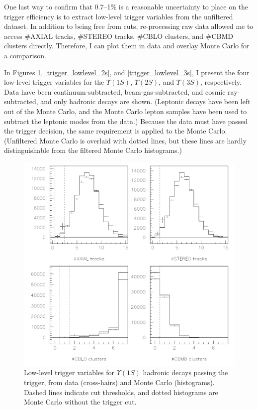 One last way to confirm that 0.7--1\% is a reasonable uncertainty to
place on the trigger efficiency is to extract low-level trigger
variables from the unfiltered dataset.  In addition to being free from
cuts, re-processing raw data allowed me to access \#AXIAL tracks,
\#STEREO tracks, \#CBLO clusters, and \#CBMD clusters directly.
Therefore, I can plot them in data and overlay Monte Carlo for a
comparison.

In Figures \ref{trigger_lowlevel_1s}, \ref{trigger_lowlevel_2s}, and
\ref{trigger_lowlevel_3s}, I present the four low-level trigger
variables for the $\Upsilon(1S)$, $\Upsilon(2S)$, and $\Upsilon(3S)$,
respectively.  Data have been continuum-subtracted,
beam-gas-subtracted, and cosmic ray-subtracted, and only hadronic
decays are shown.  (Leptonic decays have been left out of the Monte
Carlo, and the Monte Carlo lepton samples have been used to subtract
the leptonic modes from the data.)  Because the data must have passed
the trigger decision, the same requirement is applied to the Monte
Carlo.  (Unfiltered Monte Carlo is overlaid with dotted lines, but
these lines are hardly distinguishable from the filtered Monte Carlo
histograms.)

\begin{figure}[p]
  \begin{center}
    \includegraphics[width=\linewidth]{plots/trigger_lowlevel_1s}
  \end{center}
  \caption{\label{trigger_lowlevel_1s} Low-level trigger variables for
    $\Upsilon(1S)$ hadronic decays passing the trigger, from data
    (cross-hairs) and Monte Carlo (histograms).  Dashed lines indicate
    cut thresholds, and dotted histograms are Monte Carlo without the
    trigger cut.}
\end{figure}

